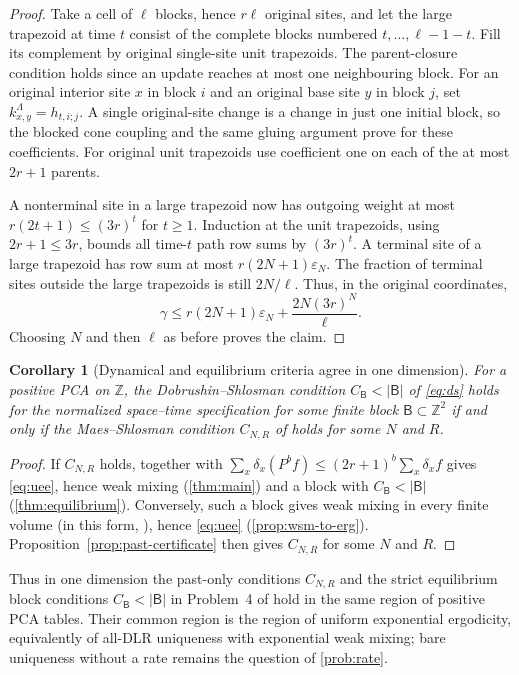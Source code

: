 \documentclass[11pt]{article}
\theoremstyle{plain}
\newtheorem{corollary}[theorem]{Corollary}
\theoremstyle{definition}
\theoremstyle{remark}
\newcommand{\Z}{\mathbb{Z}}
\begin{document}
\begin{proof}
Take a cell of $\ell$ blocks, hence $r\ell$ original sites, and let the large trapezoid at time $t$ consist of the complete blocks numbered $t,\ldots,\ell-1-t$. Fill its complement by original single-site unit trapezoids. The parent-closure condition holds since an update reaches at most one neighbouring block. For an original interior site $x$ in block $i$ and an original base site $y$ in block $j$, set $k^\Lambda_{x,y}=h_{t,i;j}$. A single original-site change is a change in just one initial block, so the blocked cone coupling and the same gluing argument prove \cite[eq.~(3-3)]{MS91} for these coefficients. For original unit trapezoids use coefficient one on each of the at most $2r+1$ parents.

A nonterminal site in a large trapezoid now has outgoing weight at most $r(2t+1)\le(3r)^t$ for $t\ge1$. Induction at the unit trapezoids, using $2r+1\le3r$, bounds all time-$t$ path row sums by $(3r)^t$. A terminal site of a large trapezoid has row sum at most $r(2N+1)\varepsilon_N$. The fraction of terminal sites outside the large trapezoids is still $2N/\ell$. Thus, in the original coordinates,
\[
 \gamma\le r(2N+1)\varepsilon_N
                 +\frac{2N(3r)^N}{\ell}.
\]
Choosing $N$ and then $\ell$ as before proves the claim.
\end{proof}

\begin{corollary}[Dynamical and equilibrium criteria agree in one dimension]
\label{cor:ds-ms}
For a positive PCA on $\Z$, the Dobrushin--Shlosman condition $C_{\mathsf B}<|\mathsf B|$ of \eqref{eq:ds} holds for the normalized space--time specification for some finite block $\mathsf B\subset\Z^2$ if and only if the Maes--Shlosman condition $C_{N,R}$ of \cite[Section~3]{MS91} holds for some $N$ and $R$.
\end{corollary}

\begin{proof}
If $C_{N,R}$ holds, \cite[Main Theorem]{MS91} together with $\sum_x\delta_x(P^bf)\le(2r+1)^b\sum_x\delta_xf$ gives \eqref{eq:uee}, hence weak mixing (\cref{thm:main}) and a block with $C_{\mathsf B}<|\mathsf B|$ (\cref{thm:equilibrium}). Conversely, such a block gives weak mixing in every finite volume \cite{DS85} (in this form, \cite[Theorem~3.1]{MOS94}), hence \eqref{eq:uee} (\cref{prop:wsm-to-erg}). Proposition~\ref{prop:past-certificate} then gives $C_{N,R}$ for some $N$ and $R$.
\end{proof}

Thus in one dimension the past-only conditions $C_{N,R}$ and the strict equilibrium block conditions $C_{\mathsf B}<|\mathsf B|$ in Problem~4 of \cite[Section~6.6]{LMS90} hold in the same region of positive PCA tables. Their common region is the region of uniform exponential ergodicity, equivalently of all-DLR uniqueness with exponential weak mixing; bare uniqueness without a rate remains the question of \cref{prob:rate}.
\end{document}

